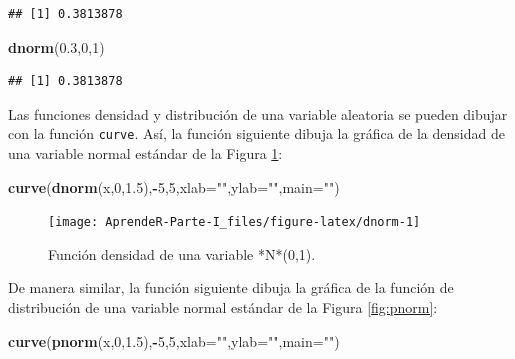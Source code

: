 \documentclass[]{book}
\newenvironment{Shaded}{\begin{snugshade}}{\end{snugshade}}
\newcommand{\DataTypeTok}[1]{\textcolor[rgb]{0.13,0.29,0.53}{#1}}
\newcommand{\DecValTok}[1]{\textcolor[rgb]{0.00,0.00,0.81}{#1}}
\newcommand{\FloatTok}[1]{\textcolor[rgb]{0.00,0.00,0.81}{#1}}
\newcommand{\KeywordTok}[1]{\textcolor[rgb]{0.13,0.29,0.53}{\textbf{#1}}}
\newcommand{\NormalTok}[1]{#1}
\newcommand{\OperatorTok}[1]{\textcolor[rgb]{0.81,0.36,0.00}{\textbf{#1}}}
\newcommand{\StringTok}[1]{\textcolor[rgb]{0.31,0.60,0.02}{#1}}
\theoremstyle{definition}
\theoremstyle{definition}
\theoremstyle{definition}
\theoremstyle{remark}
\begin{document}
\begin{verbatim}
## [1] 0.3813878
\end{verbatim}

\begin{Shaded}
\begin{Highlighting}[]
\KeywordTok{dnorm}\NormalTok{(}\FloatTok{0.3}\NormalTok{,}\DecValTok{0}\NormalTok{,}\DecValTok{1}\NormalTok{)}
\end{Highlighting}
\end{Shaded}

\begin{verbatim}
## [1] 0.3813878
\end{verbatim}

Las funciones densidad y distribución de una variable aleatoria se pueden dibujar con la función \texttt{curve}. Así, la función siguiente dibuja la gráfica de la densidad de una variable normal estándar de la Figura \ref{fig:dnorm}:

\begin{Shaded}
\begin{Highlighting}[]
\KeywordTok{curve}\NormalTok{(}\KeywordTok{dnorm}\NormalTok{(x,}\DecValTok{0}\NormalTok{,}\FloatTok{1.5}\NormalTok{),}\OperatorTok{-}\DecValTok{5}\NormalTok{,}\DecValTok{5}\NormalTok{,}\DataTypeTok{xlab=}\StringTok{""}\NormalTok{,}\DataTypeTok{ylab=}\StringTok{""}\NormalTok{,}\DataTypeTok{main=}\StringTok{""}\NormalTok{)}
\end{Highlighting}
\end{Shaded}

\begin{figure}

{\centering \texttt{[image: AprendeR-Parte-I\_files/figure-latex/dnorm-1]} 

}

\caption{Función densidad de una variable *N*(0,1).}\label{fig:dnorm}
\end{figure}

De manera similar, la función siguiente dibuja la gráfica de la función de distribución de una variable normal estándar de la Figura \ref{fig:pnorm}:

\begin{Shaded}
\begin{Highlighting}[]
\KeywordTok{curve}\NormalTok{(}\KeywordTok{pnorm}\NormalTok{(x,}\DecValTok{0}\NormalTok{,}\FloatTok{1.5}\NormalTok{),}\OperatorTok{-}\DecValTok{5}\NormalTok{,}\DecValTok{5}\NormalTok{,}\DataTypeTok{xlab=}\StringTok{""}\NormalTok{,}\DataTypeTok{ylab=}\StringTok{""}\NormalTok{,}\DataTypeTok{main=}\StringTok{""}\NormalTok{)}
\end{Highlighting}
\end{Shaded}
\end{document}
